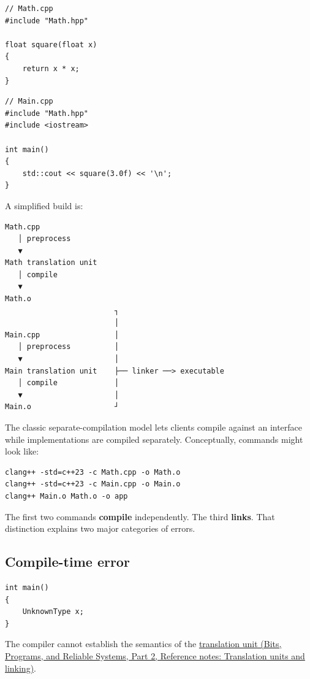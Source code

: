 \begin{verbatim}
// Math.cpp
#include "Math.hpp"

float square(float x)
{
    return x * x;
}
\end{verbatim}

\begin{verbatim}
// Main.cpp
#include "Math.hpp"
#include <iostream>

int main()
{
    std::cout << square(3.0f) << '\n';
}
\end{verbatim}

A simplified build is:

\begin{verbatim}
Math.cpp
   │ preprocess
   ▼
Math translation unit
   │ compile
   ▼
Math.o
                         ┐
                         │
Main.cpp                 │
   │ preprocess          │
   ▼                     │
Main translation unit    ├── linker ──> executable
   │ compile             │
   ▼                     │
Main.o                   ┘
\end{verbatim}

The classic separate-compilation model lets clients compile against an interface while implementations are compiled separately. Conceptually, commands might look like:

\begin{verbatim}
clang++ -std=c++23 -c Math.cpp -o Math.o
clang++ -std=c++23 -c Main.cpp -o Main.o
clang++ Main.o Math.o -o app
\end{verbatim}

The first two commands \textbf{compile} independently. The third \textbf{links}. That distinction explains two major categories of errors.

\subsection{Compile-time error}\label{05-engine-i-ch002-compile-time-error}

\hypertarget{05-engine-i-ch002-compile-time-error}{}

\begin{verbatim}
int main()
{
    UnknownType x;
}
\end{verbatim}

The compiler cannot establish the semantics of the \href{../01-Bits-Programs-and-Reliable-Systems-P02/main.pdf\#nameddest=appendix-806686359e1b}{translation unit (Bits, Programs, and Reliable Systems, Part 2, Reference notes: Translation units and linking)}.

